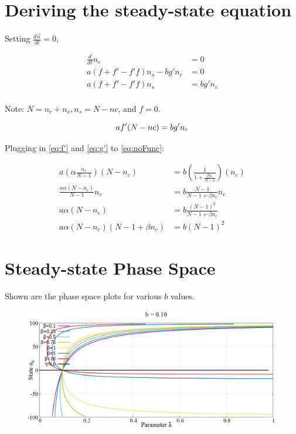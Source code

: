 \newpage
\section{Deriving the steady-state equation}
\label{apndx:derivSS}
\hspace{\parindent} Setting $\frac{d\vec{n}}{dt} = 0$,

\begin{align}
\frac{d}{dt}n_{c} & = 0\\
a(f+f'-f'f)n_{s} - bg'n_{c} & = 0\\
a(f+f'-f'f)n_{s} & = bg'n_{c} \\
\end{align}

Note: $N = n_{c} + n_{s}, n_{s} = N - n{c}$, and $f = 0$.

\begin{equation}
af'(N - n{c}) = bg'n_{c} \\
\label{eq:noFunc}
\end{equation}

Plugging in \eqref{eq:f'} and \eqref{eq:g'} to \eqref{eq:noFunc}:

\begin{align}
a(\alpha\frac{n_{c}}{N-1})(N - n_{c}) &= b(\frac{1}{1 + \frac{\beta n_{c}}{N-1}})(n_{c}) \\
\frac{a\alpha (N - n_{c})}{N-1}n_{c} &= b\frac{N-1}{N-1+\beta n_{c}}n_{c} \\
a\alpha (N - n_{c}) &= b\frac{(N-1)^2}{N-1+\beta n_{c}} \\
a\alpha(N-n_{c})(N-1 + \beta n_{c}) & = b(N-1)^{2}
\end{align}

\newpage
\section{Steady-state Phase Space}
\label{apndx:phaseSpace}
\hspace{\parindent} Shown are the phase space plots for various $b$ values.
\begin{figure}[h!]
 \centering
  \includegraphics[width=\linewidth]{images/appendix/phaseSpace/1.png}
\end{figure}

